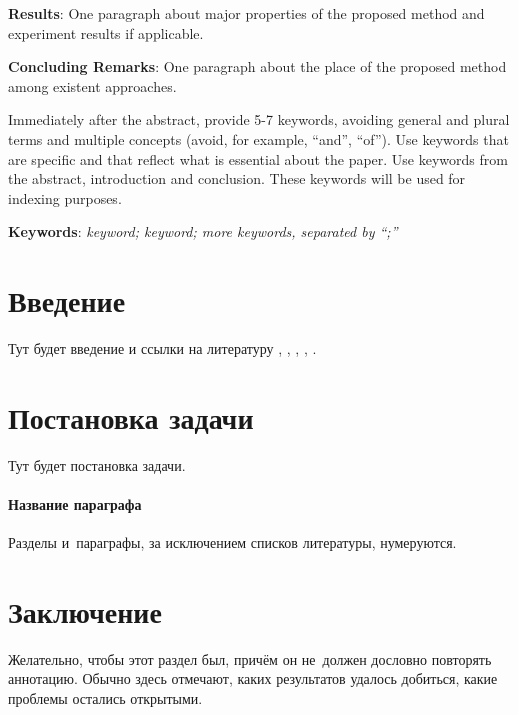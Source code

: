 \documentclass[12pt, twoside]{article}
\begin{document}
{	\noindent
	\textbf{Results}: One paragraph about major properties of the proposed method and experiment results if applicable.
	
	\noindent
	\textbf{Concluding Remarks}: One paragraph about the place of the proposed method among existent approaches.
		
	\noindent
	Immediately after the abstract, provide 5-7 keywords, avoiding general and plural terms and multiple concepts (avoid, for example, ``and'', ``of'').
	Use keywords that are specific and that reflect what is essential about the paper.
	Use keywords from the abstract, introduction and conclusion.
	These keywords will be used for indexing purposes.
		
	\noindent
    	\textbf{Keywords}: \emph{keyword; keyword; more keywords, separated by ``;''}}


\maketitle

\section{Введение}
Тут будет введение и ссылки на литературу \cite{vorontsov_co/survey-artm},
\cite{vorontsov_co/non-bayesian-armt}, \cite{yanina/multiobjective-topic-modeling},
\cite{vorontsov_co/topic-selection-artm}, \cite{vorontsov_co/artm}.

\section{Постановка задачи}
Тут будет постановка задачи.

\paragraph{Название параграфа}
Разделы и~параграфы, за исключением списков литературы, нумеруются.

\section{Заключение}
Желательно, чтобы этот раздел был, причём он не~должен дословно повторять аннотацию.
Обычно здесь отмечают, каких результатов удалось добиться, какие проблемы остались открытыми.



\end{document}
